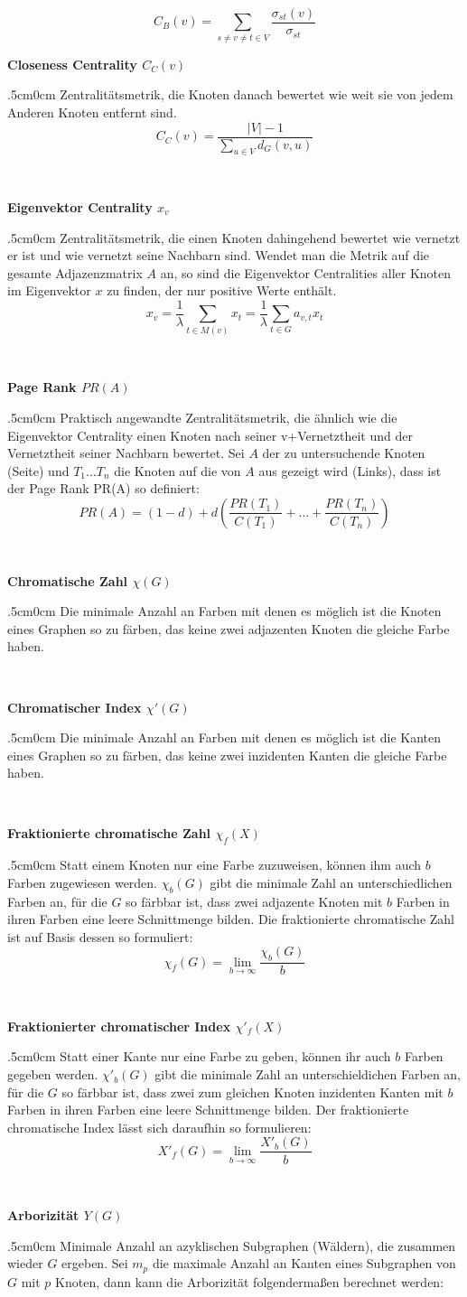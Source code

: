 \documentclass[a4paper,12pt,ngerman,chapterprefix=false,listof=totoc,bibliography=totoc]{scrreprt}
\makeatletter
\newcommand{\specialcell}[2][l]{%
  \begin{tabular}[#1]{@{}l@{}}#2\end{tabular}}
\newcommand{\metric}[2]{
	\textbf{#1}
	\begin{adjustwidth}{.5cm}{0cm}
		#2
	\end{adjustwidth}\hrulefill\\\vspace{2mm}
}
\makeatother
\begin{document}
{{{\[
	C_B(v)=\sum_{s\neq v\neq t\in V}\frac{\sigma_{st}(v)}{\sigma_{st}}
\]
}
\metric{Closeness Centrality \(C_C(v)\)}{Zentralitätsmetrik, die Knoten danach bewertet wie weit sie von jedem Anderen Knoten entfernt sind.
\[
	C_C(v)=\frac{|V|-1}{\sum_{u\in V}d_G(v,u)}	
\]
}
\metric{Eigenvektor Centrality \(x_v\)}{Zentralitätsmetrik, die einen Knoten dahingehend bewertet wie vernetzt er ist und wie vernetzt seine Nachbarn sind. Wendet man die Metrik auf die gesamte Adjazenzmatrix \(A\) an, so sind die Eigenvektor Centralities aller Knoten im Eigenvektor \(x\) zu finden, der nur positive Werte enthält.
\[
	x_v=\frac{1}{\lambda}\sum_{t\in M(v)}x_t=\frac{1}{\lambda}\sum_{t\in G}a_{v,t}x_t
\]
}
\metric{Page Rank \(PR(A)\)}{Praktisch angewandte Zentralitätsmetrik, die ähnlich wie die Eigenvektor Centrality einen Knoten nach seiner v+Vernetztheit und der Vernetztheit seiner Nachbarn bewertet. Sei \(A\) der zu untersuchende Knoten (Seite) und \(T_1\dots T_n\) die Knoten auf die von \(A\) aus gezeigt wird (Links), dass ist der Page Rank PR(A) so definiert:
\[
	PR(A) = (1-d)+d(\frac{PR(T_1)}{C(T_1)}+\dots +\frac{PR(T_n)}{C(T_n)})
\]
}
\metric{Chromatische Zahl \(\chi (G)\)}{Die minimale Anzahl an Farben mit denen es möglich ist die Knoten eines Graphen so zu färben, das keine zwei adjazenten Knoten die gleiche Farbe haben.}
\metric{Chromatischer Index \(\chi '(G)\)}{Die minimale Anzahl an Farben mit denen es möglich ist die Kanten eines Graphen so zu färben, das keine zwei inzidenten Kanten die gleiche Farbe haben.}
\metric{Fraktionierte chromatische Zahl \(\chi_f(X)\)}{Statt einem Knoten nur eine Farbe zuzuweisen, können ihm auch \(b\) Farben zugewiesen werden. \(\chi_b(G)\) gibt die minimale Zahl an unterschiedlichen Farben an, für die \(G\) so färbbar ist, dass zwei adjazente Knoten mit \(b\) Farben in ihren Farben eine leere Schnittmenge bilden. Die fraktionierte chromatische Zahl ist auf Basis dessen so formuliert:
\[\chi_f(G)=\lim_{b\to\infty}\frac{\chi_b(G)}{b}\]
}
\metric{Fraktionierter chromatischer Index \(\chi'_f(X)\)}{Statt einer Kante nur eine Farbe zu geben, können ihr auch \(b\) Farben gegeben werden. \(\chi'_b(G)\) gibt die minimale Zahl an unterschieldichen Farben an, für die \(G\) so färbbar ist, dass zwei zum gleichen Knoten inzidenten Kanten mit \(b\) Farben in ihren Farben eine leere Schnittmenge bilden. Der fraktionierte chromatische Index lässt sich daraufhin so formulieren:
\[
	X'_f(G)=\lim_{b\to\infty}\frac{X'_b(G)}{b}
\]
}
\metric{Arborizität \(Y(G)\)}{Minimale Anzahl an azyklischen Subgraphen (Wäldern), die zusammen wieder \(G\) ergeben. Sei \(m_p\) die maximale Anzahl an Kanten eines Subgraphen von \(G\) mit \(p\) Knoten, dann kann die Arborizität folgendermaßen berechnet werden:
}}}
\end{document}
